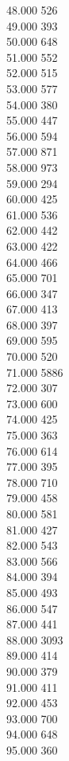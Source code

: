 { 48.000	526 \\
 49.000	393 \\
 50.000	648 \\
 51.000	552 \\
 52.000	515 \\
 53.000	577 \\
 54.000	380 \\
 55.000	447 \\
 56.000	594 \\
 57.000	871 \\
 58.000	973 \\
 59.000	294 \\
 60.000	425 \\
 61.000	536 \\
 62.000	442 \\
 63.000	422 \\
 64.000	466 \\
 65.000	701 \\
 66.000	347 \\
 67.000	413 \\
 68.000	397 \\
 69.000	595 \\
 70.000	520 \\
 71.000	5886 \\
 72.000	307 \\
 73.000	600 \\
 74.000	425 \\
 75.000	363 \\
 76.000	614 \\
 77.000	395 \\
 78.000	710 \\
 79.000	458 \\
 80.000	581 \\
 81.000	427 \\
 82.000	543 \\
 83.000	566 \\
 84.000	394 \\
 85.000	493 \\
 86.000	547 \\
 87.000	441 \\
 88.000	3093 \\
 89.000	414 \\
 90.000	379 \\
 91.000	411 \\
 92.000	453 \\
 93.000	700 \\
 94.000	648 \\
 95.000	360 \\
}
